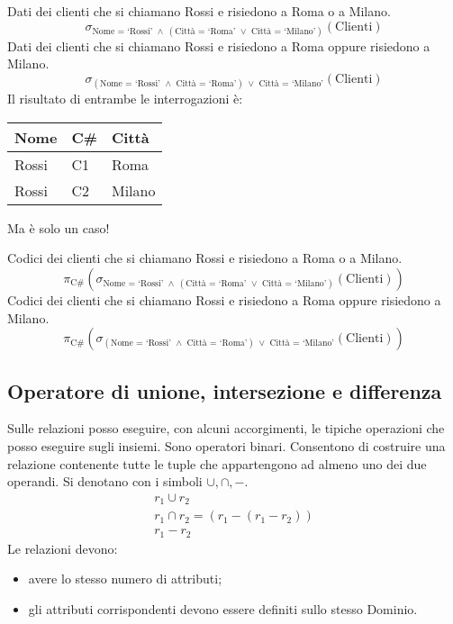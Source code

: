Dati dei clienti che si chiamano Rossi e risiedono a Roma o a Milano.
\[
\sigma_{\text{Nome = `Rossi' } \land \ \left( \text{Citt\`a = `Roma' } \lor \text{ Citt\`a = `Milano'} \right)}(\text{Clienti})
\]
Dati dei clienti che si chiamano Rossi e risiedono a Roma oppure risiedono a Milano.
\[
\sigma_{\left(\text{Nome = `Rossi' } \land \text{ Citt\`a = `Roma'} \right) \ \lor \text{ Citt\`a = `Milano'}}(\text{Clienti})
\]
Il risultato di entrambe le interrogazioni \`e:

\begin{center}
\begin{tabular}{lll}
Nome & C\# & Citt\`a \\
\hline
Rossi & C1 & Roma \\
Rossi & C2 & Milano \\
\end{tabular}
\end{center}

Ma \`e solo un caso!

Codici dei clienti che si chiamano Rossi e risiedono a Roma o a Milano.
\[
\pi_{\text{C\#}}
\left( \sigma_{\text{Nome = `Rossi' } \land \ \left( \text{Citt\`a = `Roma' } \lor \text{ Citt\`a = `Milano'} \right)}(\text{Clienti}) \right)
\]
Codici dei clienti che si chiamano Rossi e risiedono a Roma oppure risiedono a Milano.
\[
\pi_{\text{C\#}}
\left( \sigma_{\left(\text{Nome = `Rossi' } \land \text{ Citt\`a = `Roma'} \right) \ \lor \text{ Citt\`a = `Milano'}}(\text{Clienti}) \right)
\]

\subsection{Operatore di unione, intersezione e differenza}

Sulle relazioni posso eseguire, con alcuni accorgimenti, le tipiche operazioni che posso eseguire sugli insiemi. Sono operatori binari. Consentono di costruire una relazione contenente tutte le tuple che appartengono ad almeno uno dei due operandi. Si denotano con i simboli $\cup, \cap, -$.
\begin{gather*}
r_1 \cup r_2 \\
r_1 \cap r_2 = \left( r_1 - \left( r_1 - r_2 \right)\right) \\
r_1 - r_2 
\end{gather*}
Le relazioni devono:
\begin{itemize}
    \item avere lo stesso numero di attributi;
    \item gli attributi corrispondenti devono essere definiti sullo stesso Dominio.
\end{itemize} 

